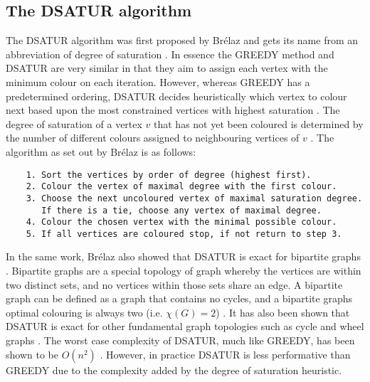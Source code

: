 \subsection{The DSATUR algorithm}
The DSATUR algorithm was first proposed by Br\'{e}laz and gets its name from an abbreviation of degree of saturation \cite{BrelazDSatur}. In essence the GREEDY method and DSATUR are very similar in that they aim to assign each vertex with the minimum colour on each iteration. However, whereas GREEDY has a predetermined ordering, DSATUR decides heuristically which vertex to colour next based upon the most constrained vertices with highest saturation \cite{LewisR.M.R2015AGtG}. The degree of saturation of a vertex $v$ that has not yet been coloured is determined by the number of different colours assigned to neighbouring vertices of $v$ \cite{BrelazDSatur, LewisR.M.R2015AGtG}. The algorithm as set out by Br\'{e}laz \cite{BrelazDSatur} is as follows:
\begin{verbatim}
    1. Sort the vertices by order of degree (highest first).
    2. Colour the vertex of maximal degree with the first colour.
    3. Choose the next uncoloured vertex of maximal saturation degree. 
       If there is a tie, choose any vertex of maximal degree.
    4. Colour the chosen vertex with the minimal possible colour.
    5. If all vertices are coloured stop, if not return to step 3.
\end{verbatim}
In the same work, Br\'{e}laz also showed that DSATUR is exact for bipartite graphs \cite{BrelazDSatur}. Bipartite graphs are a special topology of graph whereby the vertices are within two distinct sets, and no vertices within those sets share an edge. A bipartite graph can be defined as a graph that contains no cycles, and a bipartite graphs optimal colouring is always two (i.e. $\chi(G) = 2$) \cite{LewisR.M.R2015AGtG}. It has also been shown that DSATUR is exact for other fundamental graph topologies such as cycle and wheel graphs \cite{LewisR.M.R2015AGtG}. The worst case complexity of DSATUR, much like GREEDY, has been shown to be $O(n^2)$ \cite{LewisR.M.R2015AGtG}. However, in practice DSATUR is less performative than GREEDY due to the complexity added by the degree of saturation heuristic. 

